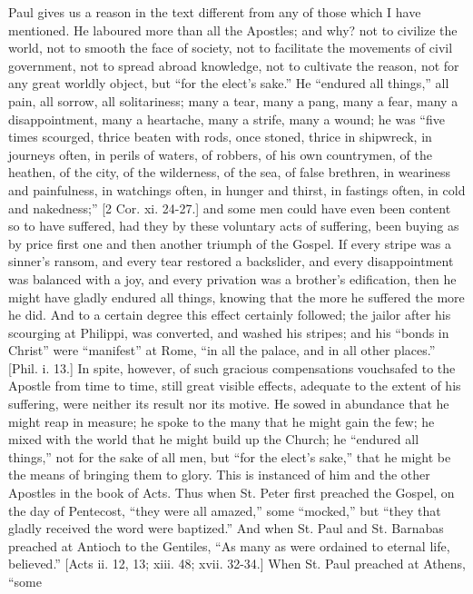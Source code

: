 Paul gives us a reason in the text different from any of those
which I have mentioned. He laboured more than all the Apostles; and
why? not to civilize the world, not to smooth the face of society, not
to facilitate the movements of civil government, not to spread abroad
knowledge, not to cultivate the reason, not for any great worldly
object, but ``for the elect's sake.'' He ``endured all
things,'' all pain, all sorrow, all solitariness; many a tear,
many a pang, many a fear, many a disappointment, many a heartache,
many a strife, many a wound; he was ``five times scourged, thrice
beaten with rods, once stoned, thrice in shipwreck, in journeys often,
in perils of waters, of robbers, of his own countrymen, of the
heathen, of the city, of the wilderness, of the sea, of false
brethren, in weariness and painfulness, in watchings often, in hunger
and thirst, in fastings often, in cold and nakedness;'' [2 Cor. xi.
24-27.] and some men could have even been content so to have suffered,
had they by these voluntary acts of suffering, been buying as by price
first one and then another triumph of the Gospel. If every stripe was
a sinner's ransom, and every tear restored a backslider, and every
disappointment was balanced with a joy, and every privation was a
brother's edification, then he might have gladly endured all things,
knowing that the more he suffered the more he did. And to a certain
degree this effect certainly followed; the jailor after his scourging
at Philippi, was converted, and washed his stripes; and his
``bonds in Christ'' were ``manifest'' at Rome,
``in all the palace, and in all other places.'' [Phil. i. 13.]
In spite, however, of such gracious compensations vouchsafed to the
Apostle from time to time, still great visible effects, adequate to
the extent of his suffering, were neither its result nor its motive.
He sowed in abundance that he might reap in measure; he spoke to the
many that he might gain the few; he mixed with the world that he might
build up the Church; he ``endured all things,'' not for the
sake of all men, but ``for the elect's sake,'' that he might
be the means of bringing them to glory. This is instanced of him and
the other Apostles in the book of Acts. Thus when St. Peter first
preached the Gospel, on the day of Pentecost, ``they were all
amazed,'' some ``mocked,'' but ``they that gladly
received the word were baptized.'' And when St. Paul and St.
Barnabas preached at Antioch to the Gentiles, ``As many as were
ordained to eternal life, believed.'' [Acts ii. 12, 13; xiii. 48;
xvii. 32-34.] When St. Paul preached at Athens, ``some
